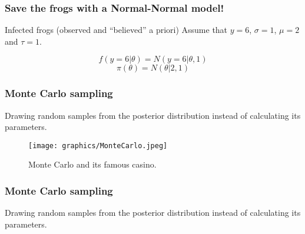 \documentclass{beamer}
\newcommand{\1}{\ensuremath{\mathbf{1}}}
\begin{document}
%
%
%
\begin{frame}\frametitle{Save the frogs with a Normal-Normal model!}
	\begin{block}{Infected frogs (observed and ``believed'' a priori)}
		Assume that $y = 6$, $\sigma = 1$, $\mu = 2$ and $\tau = 1$.
	\end{block}
	\vspace{-1ex}
	\begin{equation}
		f(y = 6|\theta) = N(y=6|\theta,1)
	\end{equation}
	\begin{equation}
		\pi(\theta) = N(\theta|2, 1)
	\end{equation}
\end{frame}
%
%
%
\begin{frame}\frametitle{Monte Carlo sampling}
	Drawing random samples from the posterior distribution instead of calculating its parameters.
	\begin{figure}
	\begin{center}
		\texttt{[image: graphics/MonteCarlo.jpeg]}
	\end{center}
	\caption{Monte Carlo and its famous casino.}
	\end{figure}
\end{frame}
%
%
%
\begin{frame}\frametitle{Monte Carlo sampling}
	Drawing random samples from the posterior distribution instead of calculating its parameters.
	\begin{center}
	\end{center}
\end{frame}
\end{document}
